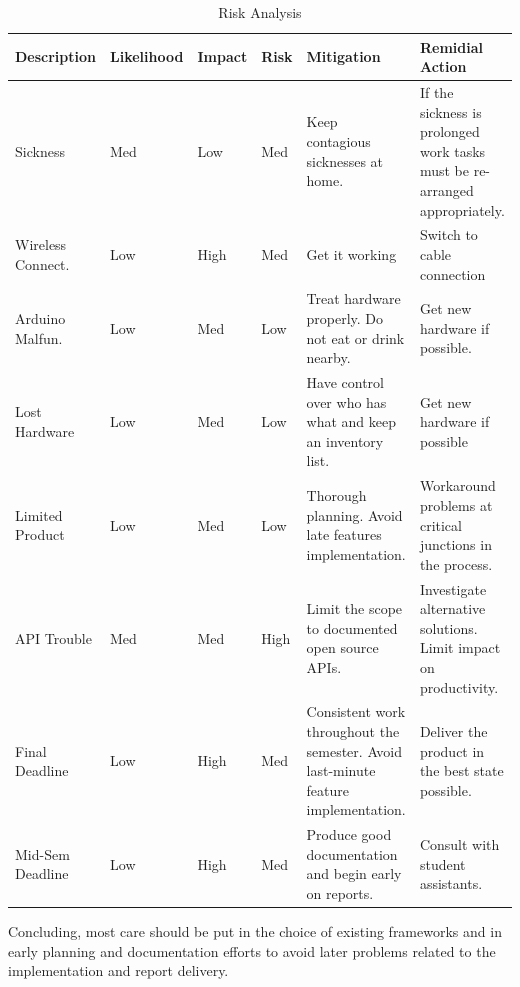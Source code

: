\begin{table}
	\begin{center}
		\begin{tabular}{| l | l | l | l | p{2.8cm} | p{2.8cm} |}
\hline

\textbf{Description} & \textbf{Likelihood} & \textbf{Impact} & \textbf{Risk} & \textbf{Mitigation} & \textbf{Remidial Action}\\ \hline

Sickness 			& Med & Low & Med & Keep contagious sicknesses at home.
					& If the sickness is prolonged work tasks must be re-arranged appropriately. \\ \hline

Wireless Connect. & Low & High & Med & Get it working & Switch to cable connection \\ \hline

Arduino Malfun. & Low & Med & Low & Treat hardware properly. Do not eat or drink nearby.
					&  Get new hardware if possible.\\ \hline

Lost Hardware & Low & Med & Low & Have control over who has what and keep an inventory list.
					& Get new hardware if possible \\ \hline

Limited Product & Low & Med & Low & Thorough planning. Avoid late features implementation.
					&  Workaround problems at critical junctions in the process.\\ \hline

API Trouble & Med & Med & High & Limit the scope to documented open source APIs.
			& Investigate alternative solutions. Limit impact on productivity. \\ \hline

Final Deadline & Low & High & Med & Consistent work throughout the semester. Avoid last-minute feature implementation.
			&  Deliver the product in the best state possible.\\ \hline
Mid-Sem Deadline & Low & High & Med & Produce good documentation and begin early on reports.
			&  Consult with student assistants.\\ \hline
		\end{tabular}
	\end{center}
	\caption{Risk Analysis}
	\label{table:riskanalysis}
\end{table}

Concluding, most care should be put in the choice of existing frameworks and in early planning
and documentation efforts to avoid later problems related to the implementation and report delivery.

